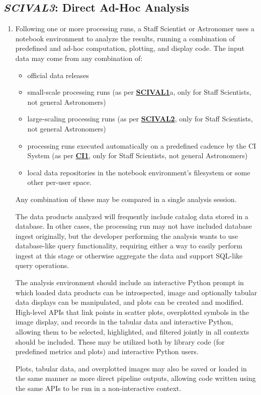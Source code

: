 \documentclass[DM,toc,lsstdraft]{lsstdoc}
\newcommand{\usecase}[3]{%
\subsection{\emph{#1}: #2}
\label{use:#1}
\begin{enumerate}[label=\alph*.]
#3
\end{enumerate}
}
\newcommand{\useref}[1]{\hyperref[use:#1]{\textcolor{lsstblue}{\textbf{#1}}}}
\begin{document}
\usecase{SCIVAL3}{Direct Ad-Hoc Analysis}{%

\item
Following one or more processing runs, a Staff Scientist or Astronomer uses a notebook environment to analyze the results, running a combination of predefined and ad-hoc computation, plotting, and display code.
The input data may come from any combination of:
\begin{itemize}
\item official data releases
\item small-scale processing runs (as per \useref{SCIVAL1}a, only for Staff Scientists, not general Astronomers)
\item large-scaling processing runs (as per \useref{SCIVAL2}, only for Staff Scientists, not general Astronomers)
\item processing runs executed automatically on a predefined cadence by the CI System (as per \useref{CI1}, only for Staff Scientists, not general Astronomers)
\item local data repositories in the notebook environment's filesystem or some other per-user space.
\end{itemize}
Any combination of these may be compared in a single analysis session.

The data products analyzed will frequently include catalog data stored in a database.  In other cases, the processing run may not have included database ingest originally, but the developer performing the analysis wants to use database-like query functionality, requiring either a way to easily perform ingest at this stage or otherwise aggregate the data and support SQL-like query operations.

The analysis environment should include an interactive Python prompt in which loaded data products can be introspected, image and optionally tabular data displays can be manipulated, and plots can be created and modified.  High-level APIs that link points in scatter plots, overplotted symbols in the image display, and records in the tabular data and interactive Python, allowing them to be selected, highlighted, and filtered jointly in all contexts should be included.  These may be utilized both by library code (for predefined metrics and plots) and interactive Python users.

Plots, tabular data, and overplotted images may also be saved or loaded in the same manner as more direct pipeline outputs, allowing code written using the same APIs to be run in a non-interactive context.

}
\end{document}
